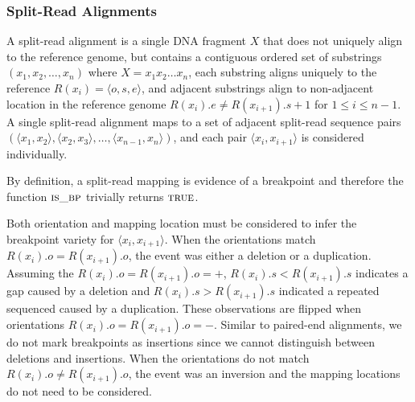 \documentclass[11pt]{article}
\begin{document}


\subsubsection{Split-Read Alignments}

A split-read alignment is a single DNA fragment $X$ that does not uniquely align
to the reference genome, but contains a contiguous ordered set of substrings
$(x_1, x_2, \dots, x_n)$ where $X=x_1x_2\dots x_n$, each substring aligns
uniquely to the reference $R(x_i)=\langle o,s,e \rangle$, and adjacent
substrings align to non-adjacent location in the reference genome
$R(x_{i}).e \neq R(x_{i+1}).s + 1$ for $1\leq i \leq n-1$. A single split-read
alignment maps to a set of adjacent split-read sequence pairs 
$(\langle x_1 , x_2 \rangle, \langle x_2, x_3 \rangle, \dots ,
\langle x_{n-1},x_n \rangle)$, and each pair $\langle x_i,x_{i+1} \rangle$ is
considered individually.

By definition, a split-read mapping is evidence of a breakpoint and therefore
the function $\textsc{is\_bp}$ trivially returns $\textsc{true}$.

Both orientation and mapping location must be considered to infer the breakpoint
variety for $\langle x_i,x_{i+1} \rangle$.  When the orientations match
$R(x_{i}).o=R(x_{i+1}).o$, the event was either a deletion or
a duplication.  Assuming the $R(x_{i}).o=R(x_{i+1}).o=+$, 
$R(x_{i}).s<R(x_{i+1}).s$ indicates a gap caused by a deletion and 
$R(x_{i}).s>R(x_{i+1}).s$ indicated a repeated sequenced caused by a
duplication.   These observations are flipped when orientations
$R(x_{i}).o=R(x_{i+1}).o=-$.  Similar to paired-end alignments, we do not mark
breakpoints as insertions since we cannot distinguish between deletions
and insertions.  When the orientations do not match $R(x_{i}).o \ne
R(x_{i+1}).o$, the event was an inversion and the mapping locations do not need
to be considered.
%
\end{document}
